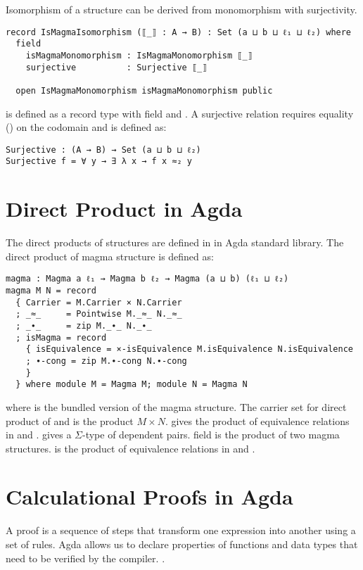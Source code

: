 Isomorphism of a structure can be derived from monomorphism with surjectivity.
\begin{verbatim}
record IsMagmaIsomorphism (⟦_⟧ : A → B) : Set (a ⊔ b ⊔ ℓ₁ ⊔ ℓ₂) where
  field
    isMagmaMonomorphism : IsMagmaMonomorphism ⟦_⟧
    surjective          : Surjective ⟦_⟧

  open IsMagmaMonomorphism isMagmaMonomorphism public
\end{verbatim} 
 is defined as a record type with field
 and . A surjective relation
requires equality () on the codomain  and is defined as:
\begin{verbatim}
Surjective : (A → B) → Set (a ⊔ b ⊔ ℓ₂)
Surjective f = ∀ y → ∃ λ x → f x ≈₂ y
\end{verbatim}

\section{Direct Product in Agda}
The direct products of structures are defined in
 in Agda standard library. The  direct
product of magma structure is defined as:
\begin{verbatim}
magma : Magma a ℓ₁ → Magma b ℓ₂ → Magma (a ⊔ b) (ℓ₁ ⊔ ℓ₂)
magma M N = record
  { Carrier = M.Carrier × N.Carrier
  ; _≈_     = Pointwise M._≈_ N._≈_
  ; _∙_     = zip M._∙_ N._∙_
  ; isMagma = record
    { isEquivalence = ×-isEquivalence M.isEquivalence N.isEquivalence
    ; ∙-cong = zip M.∙-cong N.∙-cong
    }
  } where module M = Magma M; module N = Magma N
\end{verbatim}
where  is the bundled version of the magma structure. The carrier
set for direct product of  and  is the product $M \times N$.
 gives the product of equivalence relations in  and
.  gives a $\Sigma$-type of dependent pairs.
 field is the product of two magma structures.
 is the product of equivalence relations in 
and .

\section{Calculational Proofs in Agda}
A proof is a sequence of steps that transform one expression into another using
a set of rules. Agda allows us to declare properties of functions and data types
that need to be verified by the compiler. \cite{kidney2020finiteness}.  

